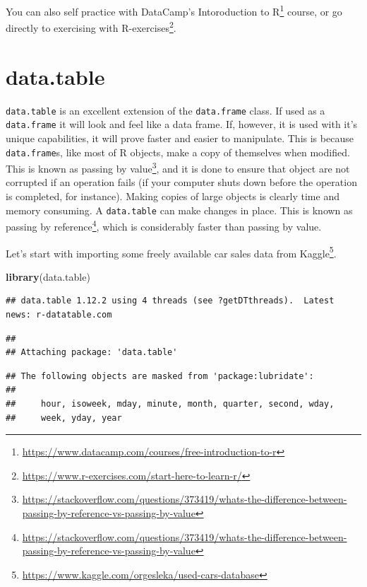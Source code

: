 \documentclass[]{book}
\newenvironment{Shaded}{\begin{snugshade}}{\end{snugshade}}
\newcommand{\KeywordTok}[1]{\textcolor[rgb]{0.13,0.29,0.53}{\textbf{#1}}}
\newcommand{\NormalTok}[1]{#1}
\renewcommand{\href}[2]{#2\footnote{\url{#1}}}
\theoremstyle{definition}
\theoremstyle{definition}
\theoremstyle{definition}
\theoremstyle{remark}
\begin{document}
You can also self practice with DataCamp's \href{https://www.datacamp.com/courses/free-introduction-to-r}{Intoroduction to R} course, or go directly to exercising with \href{https://www.r-exercises.com/start-here-to-learn-r/}{R-exercises}.

\hypertarget{datatable}{%
\chapter{data.table}\label{datatable}}

\texttt{data.table} is an excellent extension of the \texttt{data.frame} class.
If used as a \texttt{data.frame} it will look and feel like a data frame.
If, however, it is used with it's unique capabilities, it will prove faster and easier to manipulate.
This is because \texttt{data.frame}s, like most of R objects, make a copy of themselves when modified.
This is known as \href{https://stackoverflow.com/questions/373419/whats-the-difference-between-passing-by-reference-vs-passing-by-value}{passing by value}, and it is done to ensure that object are not corrupted if an operation fails (if your computer shuts down before the operation is completed, for instance).
Making copies of large objects is clearly time and memory consuming.
A \texttt{data.table} can make changes in place.
This is known as \href{https://stackoverflow.com/questions/373419/whats-the-difference-between-passing-by-reference-vs-passing-by-value}{passing by reference}, which is considerably faster than passing by value.

Let's start with importing some freely available car sales data from \href{https://www.kaggle.com/orgesleka/used-cars-database}{Kaggle}.

\begin{Shaded}
\begin{Highlighting}[]
\KeywordTok{library}\NormalTok{(data.table)}
\end{Highlighting}
\end{Shaded}

\begin{verbatim}
## data.table 1.12.2 using 4 threads (see ?getDTthreads).  Latest news: r-datatable.com
\end{verbatim}

\begin{verbatim}
## 
## Attaching package: 'data.table'
\end{verbatim}

\begin{verbatim}
## The following objects are masked from 'package:lubridate':
## 
##     hour, isoweek, mday, minute, month, quarter, second, wday,
##     week, yday, year
\end{verbatim}
\end{document}

